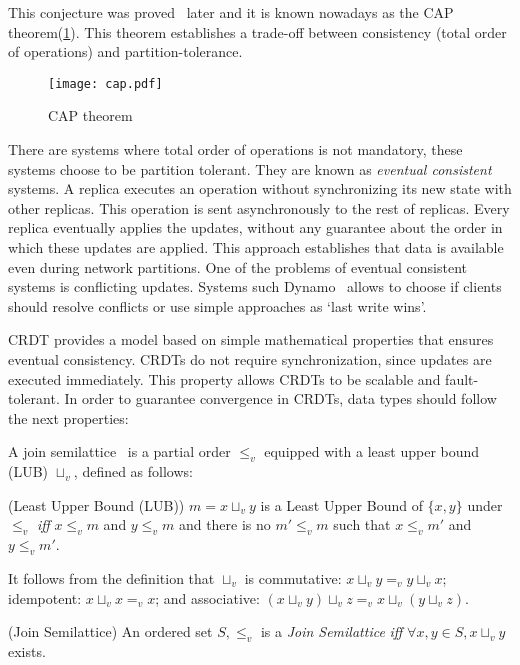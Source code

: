 This conjecture was proved~\cite{capproof} later and it is known nowadays as the CAP
theorem(\ref{fig:cap}). This theorem establishes a trade-off between consistency (total order
of operations) and partition-tolerance.

\begin{figure}[!h]
  \centering
  \texttt{[image: cap.pdf]}
  \caption{CAP theorem}
  \label{fig:cap}
\end{figure}

There are systems where total order of operations is not mandatory, these systems
choose to be partition tolerant. They are known as \textit{eventual consistent}
systems. A replica executes an operation without synchronizing its new state with
other replicas. This operation is sent asynchronously to the rest of replicas.
Every replica eventually applies the updates, without any guarantee about the
order in which these updates are applied. This approach establishes that data is
available even during network partitions. One of the problems of eventual
consistent systems is conflicting updates. Systems such Dynamo~\cite{dynamo}
allows to choose if clients should resolve conflicts or use simple approaches as
`last write wins'.

\acf{CRDT} provides a model based on simple mathematical properties that ensures
eventual consistency. \acs{CRDT}s do not require synchronization, since updates
are executed immediately. This property allows \acs{CRDT}s to be scalable and
fault-tolerant. In order to guarantee convergence in \acs{CRDT}s, data types
should follow the next properties:

A join semilattice~\cite{book:lattices} is a partial order $\leq_{v}$ equipped with a
least upper bound (LUB) $\sqcup_v$, defined as follows:

\begin{definition}{(Least Upper Bound (LUB))}
  $m = x \sqcup_v y$ is a Least Upper Bound of $\{x, y\}$ under $\leq_{v}$ \textit{iff}
  $x\leq_{v}m$ and $y\leq_{v}m$ and there is no $m'\leq_{v}m$ such that $x\leq_{v}m'$ and $y\leq_{v}m'$.
\end{definition}

It follows from the definition that $\sqcup_v$ is commutative: $x \sqcup_v y =_v y \sqcup_v x$; idempotent:
$x \sqcup_v x =_v x$; and associative: $(x \sqcup_v y) \sqcup_v z =_v x \sqcup_v (y \sqcup_v z)$.


\begin{definition}{(Join Semilattice)}
  An ordered set ${S, \leq_v}$ is a \textit{Join Semilattice} \textit{iff}
  $\forall x, y \in S, x \sqcup_v y$ exists.
\end{definition}

